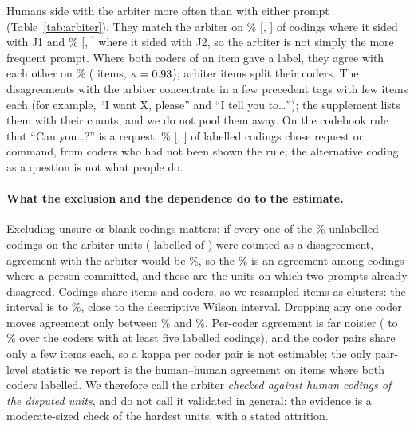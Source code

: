 Humans side with the arbiter more often than with either prompt (Table~\ref{tab:arbiter}).
They match the arbiter on \jmpOneNineMatchJOneSide{}\% [\jmpOneNineMatchJOneSideLo{}, \jmpOneNineMatchJOneSideHi{}] of codings where it sided with J1 and \jmpOneNineMatchJTwoSide{}\% [\jmpOneNineMatchJTwoSideLo{}, \jmpOneNineMatchJTwoSideHi{}] where it sided with J2, so the arbiter is not simply the more frequent prompt.
Where both coders of an item gave a label, they agree with each other on \jmpOneNineHHAgree{}\% (\jmpOneNineHHItems{} items, $\kappa=0.93{}$); \jmpOneNineSplit{} arbiter items split their coders.
The disagreements with the arbiter concentrate in a few precedent tags with few items each (for example, ``I want X, please'' and ``I tell you to\ldots''); the supplement lists them with their counts, and we do not pool them away.
On the codebook rule that ``Can you\ldots?'' is a request, \jmpOneNineCanYouRequest{}\% [\jmpOneNineCanYouRequestLo{}, \jmpOneNineCanYouRequestHi{}] of \jmpOneNineCanYouLabelled{} labelled codings chose request or command, from coders who had not been shown the rule; the alternative coding as a question is not what people do.
\paragraph{What the exclusion and the dependence do to the estimate.}
Excluding unsure or blank codings matters: if every one of the \jmpOneNineSensUnsure{}\% unlabelled codings on the arbiter units (\jmpOneNineSensLabelled{} labelled of \jmpOneNineSensTotal{}) were counted as a disagreement, agreement with the arbiter would be \jmpOneNineSensLowerBound{}\%, so the \jmpOneNineAgreeArb{}\% is an agreement among codings where a person committed, and these are the units on which two prompts already disagreed.
Codings share items and coders, so we resampled items as clusters: the interval is \jmpOneNineSensBootLo{} to \jmpOneNineSensBootHi{}\%, close to the descriptive Wilson interval.
Dropping any one coder moves agreement only between \jmpOneNineSensLooMin{}\% and \jmpOneNineSensLooMax{}\%.
Per-coder agreement is far noisier (\jmpOneNineSensCoderMin{} to \jmpOneNineSensCoderMax{}\% over the \jmpOneNineSensCoderN{} coders with at least five labelled codings), and the \jmpOneNineSensCoderPairs{} coder pairs share only a few items each, so a kappa per coder pair is not estimable; the only pair-level statistic we report is the human--human agreement on items where both coders labelled.
We therefore call the arbiter \emph{checked against human codings of the disputed units}, and do not call it validated in general: the evidence is a moderate-sized check of the hardest units, with a stated attrition.

